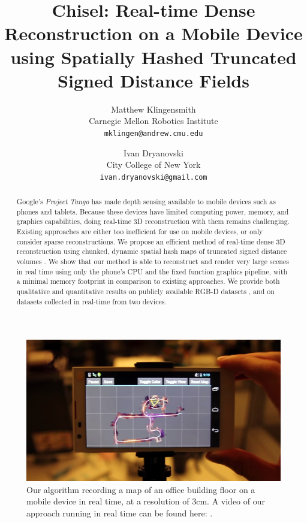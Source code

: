 \documentclass[conference,10pt]{IEEEtran}
\title{\Large Chisel: Real-time Dense Reconstruction on a Mobile Device \\
using Spatially Hashed Truncated Signed Distance Fields}
\begin{document}
\author
{
	Matthew Klingensmith \\
	Carnegie Mellon Robotics Institute\\
	\texttt{mklingen@andrew.cmu.edu}
	\and
	Ivan Dryanovski \\
	City College of New York\\
	\texttt{ivan.dryanovski@gmail.com}
}


\maketitle

\begin{figure}
  \centering
    \includegraphics[width=1.0\columnwidth]{img/mapdevice}
      \caption{Our algorithm recording a map of an office building floor on a mobile
  device in real time, at a resolution of 3cm. A video of our approach running
  in real time can be found here: \cite{TangoVideo}.}
  \label{fig:map_device}
\end{figure}


\begin{abstract}
Google's \textit{Project Tango}\cite{Tango} has made depth sensing available to
mobile devices such as phones and tablets. Because these devices have limited
computing power, memory, and graphics capabilities, doing real-time 3D
reconstruction with them remains challenging. Existing approaches are either too
inefficient for use on mobile devices, or only consider sparse reconstructions.
We propose an efficient method of real-time dense 3D reconstruction using
chunked, dynamic spatial hash maps \cite{SpatialHashing} of truncated signed distance volumes \cite{Curless1996}.
We show that our method is able to reconstruct and render very large scenes in
real time using only the phone's CPU and the fixed function graphics pipeline,
with a minimal memory footprint in comparison to existing approaches. We
provide both qualitative and quantitative results on publicly available RGB-D
datasets \cite{FREIBURG}, and on datasets collected in real-time from two
devices.
\end{abstract}
\end{document}
